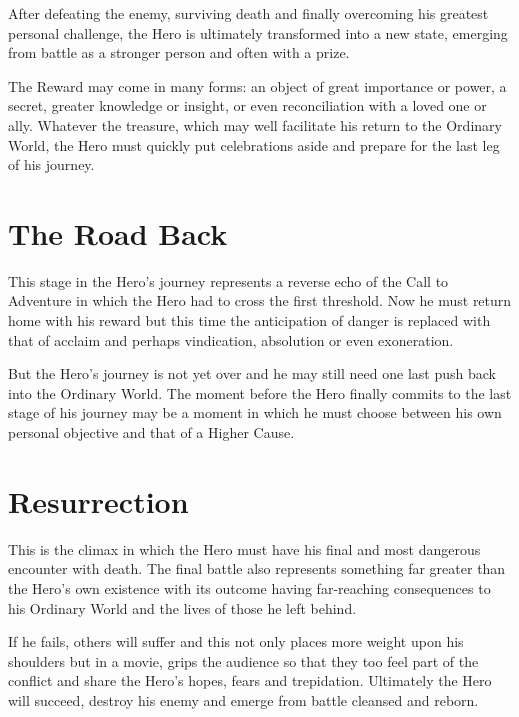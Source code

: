 \documentclass[oneside]{book}
\begin{document}
After defeating the enemy, surviving death and finally overcoming his greatest personal challenge, the Hero is ultimately transformed into a new state, emerging from battle as a stronger person and often with a prize.

The Reward may come in many forms: an object of great importance or power, a secret, greater knowledge or insight, or even reconciliation with a loved one or ally. Whatever the treasure, which may well facilitate his return to the Ordinary World, the Hero must quickly put celebrations aside and prepare for the last leg of his journey.



\newpage

\chapter{The Road Back}

This stage in the Hero's journey represents a reverse echo of the Call to Adventure in which the Hero had to cross the first threshold. Now he must return home with his reward but this time the anticipation of danger is replaced with that of acclaim and perhaps vindication, absolution or even exoneration.

But the Hero's journey is not yet over and he may still need one last push back into the Ordinary World. The moment before the Hero finally commits to the last stage of his journey may be a moment in which he must choose between his own personal objective and that of a Higher Cause.



\newpage

\chapter{Resurrection}

This is the climax in which the Hero must have his final and most dangerous encounter with death. The final battle also represents something far greater than the Hero's own existence with its outcome having far-reaching consequences to his Ordinary World and the lives of those he left behind.

If he fails, others will suffer and this not only places more weight upon his shoulders but in a movie, grips the audience so that they too feel part of the conflict and share the Hero's hopes, fears and trepidation. Ultimately the Hero will succeed, destroy his enemy and emerge from battle cleansed and reborn.
\end{document}
